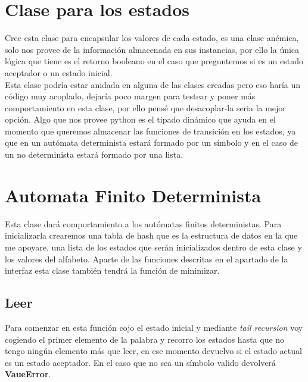 \documentclass{article}
\begin{document}
    \section{Clase para los estados}\label{sec:clase-para-los-estados}
    Cree esta clase para encapsular los valores de cada estado, es una clase anémica, solo nos provee de la información
    almacenada en sus instancias, por ello la única lógica que tiene es el retorno booleano en el caso que preguntemos
    si es un estado aceptador o un estado inicial.\\
    Esta clase podría estar anidada en alguna de las clases creadas pero eso haría un código muy acoplado, dejaría poco
    margen para testear y poner más comportamiento en esta clase, por ello pensé que desacoplar-la seria la mejor opción.
    Algo que nos provee python es el tipado dinámico que ayuda en el momento que queremos almacenar las funciones de
    transición en los estados, ya que en un autómata determinista estará formado por un símbolo y en el caso de un no
    determinista estará formado por una lista.

    \section{Automata Finito Determinista}\label{sec:automata-finito-determinista}
    Esta clase dará comportamiento a los autómatas finitos deterministas.
    Para inicializarla crearemos una tabla de hash que es la estructura de datos en la que me apoyare, una lista de los
    estados que serán inicializados dentro de esta clase y los valores del alfabeto.
    Aparte de las funciones descritas en el apartado de la interfaz esta clase también tendrá la función de minimizar.
    \subsection{Leer}\label{subsec:leer2}
    Para comenzar en esta función cojo el estado inicial y mediante \textit{tail recursion} voy cogiendo el primer
    elemento de la palabra y recorro los estados hasta que no tengo ningún elemento más que leer, en ese momento
    devuelvo si el estado actual es un estado aceptador.
    En el caso que no sea un símbolo valido devolverá \textbf{VaueError}.
\end{document}
